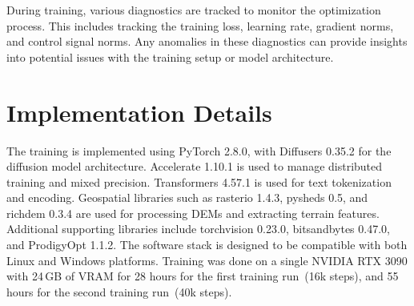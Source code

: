 During training, various diagnostics are tracked to monitor the optimization process. This includes tracking the training loss, learning rate, gradient norms, and control signal norms. Any anomalies in these diagnostics can provide insights into potential issues with the training setup or model architecture.

\section{Implementation Details}
\label{sec:implementation_details}

The training is implemented using PyTorch 2.8.0, with Diffusers 0.35.2 for the diffusion model architecture. Accelerate 1.10.1 is used to manage distributed training and mixed precision. Transformers 4.57.1 is used for text tokenization and encoding. Geospatial libraries such as rasterio 1.4.3, pysheds 0.5, and richdem 0.3.4 are used for processing DEMs and extracting terrain features. Additional supporting libraries include torchvision 0.23.0, bitsandbytes 0.47.0, and ProdigyOpt 1.1.2. The software stack is designed to be compatible with both Linux and Windows platforms.
Training was done on a single NVIDIA RTX 3090 with 24\,GB of VRAM for 28 hours for the first training run~(16k steps), and 55 hours for the second training run~(40k steps).
